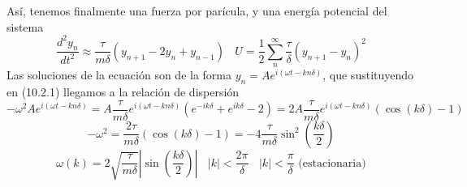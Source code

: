 Así, tenemos finalmente una fuerza por parícula, y una energía potencial del sistema
\begin{equation} \label{6.1.1}
    \frac{d^2 y_n}{dt^2} \approx \frac{\tau}{m \delta} \left(y_{n+1}-2y_n+y_{n-1}\right) \ \ \ \ U = \frac{1}{2} \sum_n^\infty \frac{\tau}{\delta} (y_{n+1}-y_n)^2
\end{equation}
Las soluciones de la ecuación son de la forma $y_n = A e^{i(\omega t - k n \delta)}$, que sustituyendo en (10.2.1) llegamos a la relación de dispersión
\[
    -\omega^2 A e^{i(\omega t - k n \delta)}= A\frac{\tau}{m \delta} e^{i(\omega t - k n \delta)} \left(e^{-ik\delta}+e^{ik\delta}-2\right) = 2A\frac{\tau}{m \delta} e^{i(\omega t - k n \delta)} \left(\cos(k \delta) - 1\right)
\]\[
    -\omega^2 = \frac{2 \tau}{m \delta}\left(\cos(k \delta) - 1\right) = -4 \frac{\tau}{m \delta} \sin^2{\left(\frac{k\delta}{2}\right)}
\]
\begin{equation} \label{6.1.1}
    \omega (k) = 2 \sqrt{\frac{\tau}{m\delta}} \left|\sin\left(\frac{k\delta}{2}\right)\right| \ \ \ \ |k| < \frac{2\pi}{\delta} \ \ \ \ |k| < \frac{\pi}{\delta} \mbox{ (estacionaria)}
\end{equation}

